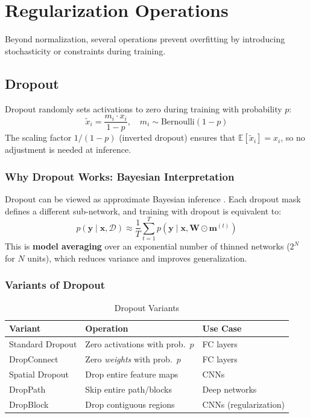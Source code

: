 \section{Regularization Operations}

Beyond normalization, several operations prevent overfitting by introducing stochasticity or constraints during training.

\subsection{Dropout}

Dropout \cite{srivastava2014dropout} randomly sets activations to zero during training with probability $p$:
\begin{equation}
\tilde{x}_i = \frac{m_i \cdot x_i}{1 - p}, \quad m_i \sim \text{Bernoulli}(1 - p)
\end{equation}
The scaling factor $1/(1-p)$ (inverted dropout) ensures that $\mathbb{E}[\tilde{x}_i] = x_i$, so no adjustment is needed at inference.

\subsubsection{Why Dropout Works: Bayesian Interpretation}

Dropout can be viewed as approximate Bayesian inference \cite{gal2016dropout}. Each dropout mask defines a different sub-network, and training with dropout is equivalent to:
\begin{equation}
p(\mathbf{y} \mid \mathbf{x}, \mathcal{D}) \approx \frac{1}{T}\sum_{t=1}^{T} p(\mathbf{y} \mid \mathbf{x}, \mathbf{W} \odot \mathbf{m}^{(t)})
\end{equation}
This is \textbf{model averaging} over an exponential number of thinned networks ($2^N$ for $N$ units), which reduces variance and improves generalization.

\subsubsection{Variants of Dropout}

\begin{table}[ht]
    \centering
    \caption{Dropout Variants}
    \begin{tabular}{L{3cm} L{4.5cm} L{4.5cm}}
        \toprule
        \textbf{Variant} & \textbf{Operation} & \textbf{Use Case} \\
        \midrule
        Standard Dropout & Zero activations with prob.\ $p$ & FC layers \\
        DropConnect & Zero \textit{weights} with prob.\ $p$ & FC layers \\
        Spatial Dropout & Drop entire feature maps & CNNs \\
        DropPath & Skip entire path/blocks & Deep networks \\
        DropBlock & Drop contiguous regions & CNNs (regularization) \\
        \bottomrule
    \end{tabular}
\end{table}

